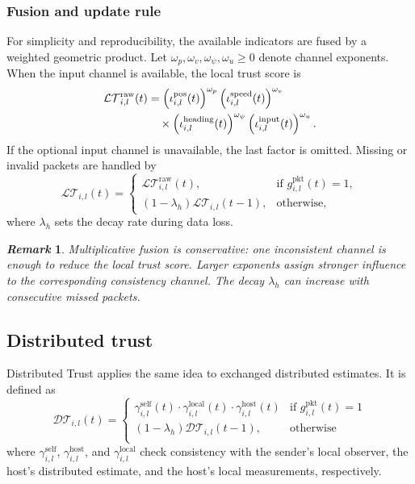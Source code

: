 \documentclass[letterpaper,journal]{IEEEtran}
\def\LT{\mathcal{LT}} %
\def\DT{\mathcal{DT}} %
\newtheorem{remark}{\it Remark}%
\begin{document}
\subsubsection{Fusion and update rule}
For simplicity and reproducibility, the available indicators are fused by a weighted geometric product. Let $\omega_p,\omega_v,\omega_\psi,\omega_u\ge0$ denote channel exponents. When the input channel is available, the local trust score is
\begin{align}
    \LT_{i,l}^{\mathrm{raw}}(t)
    &=\left(\iota_{i,l}^{\text{pos}}(t)\right)^{\omega_p}
    \left(\iota_{i,l}^{\text{speed}}(t)\right)^{\omega_v}
    \notag\\
    &\quad\times
    \left(\iota_{i,l}^{\text{heading}}(t)\right)^{\omega_\psi}
    \left(\iota_{i,l}^{\text{input}}(t)\right)^{\omega_u}.
    \label{eq_local_trust_product}
\end{align}
If the optional input channel is unavailable, the last factor is omitted. Missing or invalid packets are handled by
\begin{equation}
    \LT_{i,l}(t) =
    \left\{ \begin{array}{ll}
        \LT_{i,l}^{\mathrm{raw}}(t),  &  \text{if } g_{i,l}^{\mathrm{pkt}}(t) = 1, \\
        (1 - \lambda_h)\LT_{i,l}(t-1), & \text{otherwise,}
    \end{array}\right.
    \label{eq_local_trust_update}
\end{equation}
where $\lambda_h$ sets the decay rate during data loss.
\begin{remark}
    Multiplicative fusion is conservative: one inconsistent channel is enough to reduce the local trust score. Larger exponents assign stronger influence to the corresponding consistency channel. The decay $\lambda_h$ can increase with consecutive missed packets.
\end{remark}

\subsection{Distributed trust}
Distributed Trust applies the same idea to exchanged distributed estimates. It is defined as
\begin{equation}
        \DT_{i,l}(t)  = \begin{cases}
       \gamma_{i,l}^{\text{self}}(t) \cdot \gamma_{i,l}^{\text{local}}(t) \cdot
        \gamma_{i,l}^{\text{host}}(t)   &  \text{if } g_{i,l}^{\mathrm{pkt}}(t) = 1 \\
        (1 - \lambda_h)\DT_{i,l}(t-1), & \text{otherwise} \\
    \end{cases}
\end{equation}
where $\gamma_{i,l}^{\text{self}}$, $\gamma_{i,l}^{\text{host}}$, and $\gamma_{i,l}^{\text{local}}$ check consistency with the sender's local observer, the host's distributed estimate, and the host's local measurements, respectively.
\end{document}
